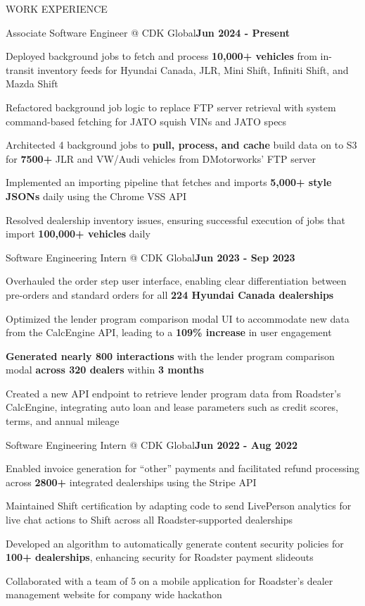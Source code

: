 \documentclass[]{resume}
\begin{document}
\begin{section}{WORK EXPERIENCE}
    \begin{subsection}{Associate Software Engineer @ CDK Global}{}{\textbf{Jun 2024 - Present}}{}
        \item Deployed background jobs to fetch and process \textbf{10,000+ vehicles} from in-transit inventory feeds for Hyundai Canada, JLR, Mini Shift, Infiniti Shift, and Mazda Shift
        \item Refactored background job logic to replace FTP server retrieval with system command-based fetching for JATO squish VINs and JATO specs
        \item Architected 4 background jobs to \textbf{pull, process, and cache} build data on to S3 for \textbf{7500+} JLR and VW/Audi vehicles from DMotorworks' FTP server
        \item Implemented an importing pipeline that fetches and imports \textbf{5,000+ style JSONs} daily using the Chrome VSS API
        \item Resolved dealership inventory issues, ensuring successful execution of jobs that import \textbf{100,000+ vehicles} daily
    \end{subsection}
    \begin{subsection}{Software Engineering Intern @ CDK Global}{}{\textbf{Jun 2023 - Sep 2023}}{}
        \item Overhauled the order step user interface, enabling clear differentiation between pre-orders and standard orders for all \textbf{224 Hyundai Canada dealerships}
        \item Optimized the lender program comparison modal UI to accommodate new data from the CalcEngine API, leading to a \textbf{109\% increase} in user engagement
        \item \textbf{Generated nearly 800 interactions} with the lender program comparison modal \textbf{across 320 dealers} within \textbf{3 months}
        \item Created a new API endpoint to retrieve lender program data from Roadster's CalcEngine, integrating auto loan and lease parameters such as credit scores, terms, and annual mileage
    \end{subsection}
    \begin{subsection}{Software Engineering Intern @ CDK Global}{}{\textbf{Jun 2022 - Aug 2022}}{}
        \item Enabled invoice generation for “other” payments and facilitated refund processing across \textbf{2800+} integrated dealerships using the Stripe API
        \item Maintained Shift certification by adapting code to send LivePerson analytics for live chat actions to Shift across all Roadster-supported dealerships
        \item Developed an algorithm to automatically generate content security policies for \textbf{100+ dealerships}, enhancing security for Roadster payment slideouts
        \item Collaborated with a team of 5 on a mobile application for Roadster’s dealer management website for company wide hackathon
    \end{subsection}
\end{section}
\end{document}
